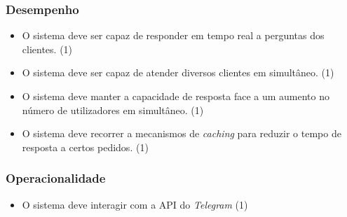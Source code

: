 \documentclass[11pt,a4paper]{article}
\newcommand{\requirement}[3]{
    #1 (#3)
}
\begin{document}
\begin{appendices}
\subsubsection{Desempenho}
\begin{itemize}
    \setlength\itemsep{0em}
    \item \requirement
    {O sistema deve ser capaz de responder em tempo real a perguntas dos clientes.}
    {Para garantir a satisfação dos clientes é importante responder rapidamente às suas questões.}
    {1}
    \item \requirement
    {O sistema deve ser capaz de atender diversos clientes em simultâneo.}
    {Visto a NOS poder trazer muitos potenciais utilizadores do sistema, este deve estar preparado para atender vários clientes em simultâneo.}
    {1}
    \item \requirement
    {O sistema deve manter a capacidade de resposta face a um aumento no número de utilizadores em simultâneo.}
    {Visto a NOS poder trazer muitos potenciais utilizadores do sistema, este deve estar preparado para responder a muitos pedidos.}
    {1}
    \item \requirement
    {O sistema deve recorrer a mecanismos de \textit{caching} para reduzir o tempo de resposta a certos pedidos.}
    {A utilização de mecanismos de \textit{caching} permite evitar consultas redundantes para dados que já tenham 
    sido requisitados.}
    {1}
\end{itemize}

\subsubsection{Operacionalidade}
\begin{itemize}
    \setlength\itemsep{0em}
    \item \requirement{O sistema deve interagir com a API do \textit{Telegram}}
    {De forma a estabelecer uma conversa com o utilizador, a aplicação deve ter acesso à 
    API do \textit{Telegram}, para recolher mensagens, enviar mensagens, etc.}
    {1}
\end{itemize}


\end{appendices}
\end{document}
